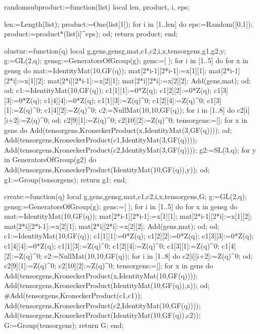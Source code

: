 
randomsubproduct:=function(list)
local len, product, i, eps;

len:=Length(list);
product:=One(list[1]);
for i in [1..len] do
    eps:=Random([0,1]);
    product:=product*(list[i]^eps);
od;
return product;
end;



olustur:=function(q)
local g,gens,gensg,mat,c1,c2,i,x,tensorgens,g1,g2,y;
g:=GL(2,q);
gensg:=GeneratorsOfGroup(g);
gens:=[ ];
for i in [1..5] do
     for x in gensg do
          mat:=IdentityMat(10,GF(q));
                   mat[2*i-1][2*i-1]:=x[1][1];
                   mat[2*i-1][2*i]:=x[1][2];
                   mat[2*i][2*i-1]:=x[2][1];
                   mat[2*i][2*i]:=x[2][2];
          Add(gens,mat);
      od;
od;
c1:=IdentityMat(10,GF(q));
c1[1][1]:=0*Z(q);
c1[2][2]:=0*Z(q);
c1[3][3]:=0*Z(q);
c1[4][4]:=0*Z(q);
c1[1][3]:=Z(q)^0;
c1[2][4]:=Z(q)^0;
c1[3][1]:=Z(q)^0;
c1[4][2]:=Z(q)^0;
c2:=NullMat(10,10,GF(q));
for i in [1..8] do
     c2[i][i+2]:=Z(q)^0;
od;
c2[9][1]:=Z(q)^0;
c2[10][2]:=Z(q)^0;
tensorgens:=[];
for x in gens do
     Add(tensorgens,KroneckerProduct(x,IdentityMat(3,GF(q))));
od;
Add(tensorgens,KroneckerProduct(c1,IdentityMat(3,GF(q))));
Add(tensorgens,KroneckerProduct(c2,IdentityMat(3,GF(q))));
g2:=SL(3,q);
for y in GeneratorsOfGroup(g2) do
     Add(tensorgens,KroneckerProduct(IdentityMat(10,GF(q)),y));
od;
g1:=Group(tensorgens);
return g1;
end;

create:=function(q)
local g,gens,gensg,mat,c1,c2,i,x,tensorgens,G;
g:=GL(2,q);
gensg:=GeneratorsOfGroup(g);
gens:=[ ];
for i in [1..5] do
     for x in gensg do
          mat:=IdentityMat(10,GF(q));
                   mat[2*i-1][2*i-1]:=x[1][1];
                   mat[2*i-1][2*i]:=x[1][2];
                   mat[2*i][2*i-1]:=x[2][1];
                   mat[2*i][2*i]:=x[2][2];
          Add(gens,mat);
      od;
od;
c1:=IdentityMat(10,GF(q));
c1[1][1]:=0*Z(q);
c1[2][2]:=0*Z(q);
c1[3][3]:=0*Z(q);
c1[4][4]:=0*Z(q);
c1[1][3]:=Z(q)^0;
c1[2][4]:=Z(q)^0;
c1[3][1]:=Z(q)^0;
c1[4][2]:=Z(q)^0;
c2:=NullMat(10,10,GF(q));
for i in [1..8] do
     c2[i][i+2]:=Z(q)^0;
od;
c2[9][1]:=Z(q)^0;
c2[10][2]:=Z(q)^0;
tensorgens:=[];
for x in gens do
     Add(tensorgens,KroneckerProduct(x,IdentityMat(10,GF(q))));
     Add(tensorgens,KroneckerProduct(IdentityMat(10,GF(q)),x));
od;
#Add(tensorgens,KroneckerProduct(c1,c1));
Add(tensorgens,KroneckerProduct(c2,IdentityMat(10,GF(q))));
Add(tensorgens,KroneckerProduct(IdentityMat(10,GF(q)),c2));
G:=Group(tensorgens);
return G;
end;


